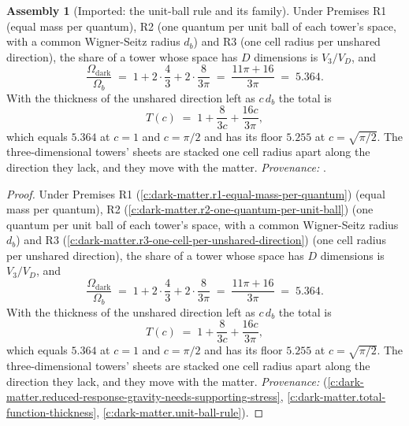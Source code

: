 \documentclass[11pt]{article}
\theoremstyle{definition}
\newtheorem{assembled}[theorem]{Assembly}
\theoremstyle{plain}
\begin{document}
\begin{assembled}[Imported: the unit-ball rule and its family]\label{c:simulations.imported-unit-ball-rule-family}
Under Premises R1 (equal mass per quantum), R2 (one quantum per unit ball of each tower's space, with a common Wigner-Seitz radius $d_{b}$) and R3 (one cell radius per unshared direction), the share of a tower whose space has $D$ dimensions is $V_{3}/V_{D}$, and
\[
\frac{\Omega_{\mathrm{dark}}}{\Omega_{b}} \;=\; 1 + 2\cdot\frac{4}{3} + 2\cdot\frac{8}{3\pi} \;=\; \frac{11\pi + 16}{3\pi} \;=\; 5.364 .
\]
With the thickness of the unshared direction left as $c\,d_{b}$ the total is
\[
T(c) \;=\; 1 + \frac{8}{3c} + \frac{16c}{3\pi},
\]
which equals $5.364$ at $c = 1$ and $c = \pi/2$ and has its floor $5.255$ at $c = \sqrt{\pi/2}$. The three-dimensional towers' sheets are stacked one cell radius apart along the direction they lack, and they move with the matter. \emph{Provenance:} \cite[Prems.~7.2 to 7.4, Props.~7.6, 7.15 and 7.28]{ButlerT14}.
\end{assembled}
\begin{proof}
Under Premises R1 (\ref{c:dark-matter.r1-equal-mass-per-quantum}) (equal mass per quantum), R2 (\ref{c:dark-matter.r2-one-quantum-per-unit-ball}) (one quantum per unit ball of each tower's space, with a common Wigner-Seitz radius $d_{b}$) and R3 (\ref{c:dark-matter.r3-one-cell-per-unshared-direction}) (one cell radius per unshared direction), the share of a tower whose space has $D$ dimensions is $V_{3}/V_{D}$, and
\[
\frac{\Omega_{\mathrm{dark}}}{\Omega_{b}} \;=\; 1 + 2\cdot\frac{4}{3} + 2\cdot\frac{8}{3\pi} \;=\; \frac{11\pi + 16}{3\pi} \;=\; 5.364 .
\]
With the thickness of the unshared direction left as $c\,d_{b}$ the total is
\[
T(c) \;=\; 1 + \frac{8}{3c} + \frac{16c}{3\pi},
\]
which equals $5.364$ at $c = 1$ and $c = \pi/2$ and has its floor $5.255$ at $c = \sqrt{\pi/2}$. The three-dimensional towers' sheets are stacked one cell radius apart along the direction they lack, and they move with the matter. \emph{Provenance:} \cite[Prems.~7.2 to 7.4, Props.~7.6, 7.15 and 7.28]{ButlerT14} (\ref{c:dark-matter.reduced-response-gravity-needs-supporting-stress}, \ref{c:dark-matter.total-function-thickness}, \ref{c:dark-matter.unit-ball-rule}).

\end{proof}
\end{document}
